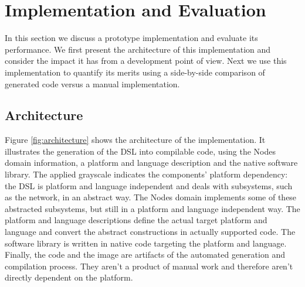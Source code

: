 \documentclass[conference]{IEEEtran}
\begin{document}
\section{Implementation and Evaluation}
\label{evaluation}

In this section we discuss a prototype implementation and evaluate its
performance. We first present the architecture of this implementation and
consider the impact it has from a development point of view. Next we use this
implementation to quantify its merits using a side-by-side comparison of
generated code versus a manual implementation.

\subsection*{Architecture}

Figure \ref{fig:architecture} shows the architecture of the implementation. It
illustrates the generation of the DSL into compilable code, using the Nodes
domain information, a platform and language description and the native software
library. The applied grayscale indicates the components' platform dependency:
the DSL is platform and language independent and deals with subsystems, such as
the network, in an abstract way. The Nodes domain implements some of these
abstracted subsystems, but still in a platform and language independent way.
The platform and language descriptions define the actual target platform and
language and convert the abstract constructions in actually supported code. The
software library is written in native code targeting the platform and language.
Finally, the code and the image are artifacts of the automated generation and
compilation process. They aren't a product of manual work and therefore aren't
directly dependent on the platform.
\end{document}
